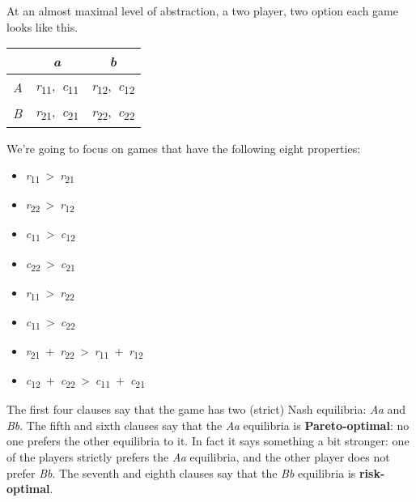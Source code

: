 \documentclass[
  11pt,
]{book}
\providecommand{\tightlist}{%
  \setlength{\itemsep}{0pt}\setlength{\parskip}{0pt}}
\begin{document}
At an almost maximal level of abstraction, a two player, two option each game looks like this.

\begin{longtable}[]{@{}lcc@{}}
\toprule()
& \emph{a} & \emph{b} \\
\midrule()
\endhead
\emph{A} & \emph{r}\textsubscript{11},~\emph{c}\textsubscript{11} & \emph{r}\textsubscript{12},~\emph{c}\textsubscript{12} \\
\emph{B} & \emph{r}\textsubscript{21},~\emph{c}\textsubscript{21} & \emph{r}\textsubscript{22},~\emph{c}\textsubscript{22} \\
\bottomrule()
\end{longtable}

We're going to focus on games that have the following eight properties:

\begin{itemize}
\tightlist
\item
  \emph{r}\textsubscript{11}~\textgreater~\emph{r}\textsubscript{21}
\item
  \emph{r}\textsubscript{22}~\textgreater~\emph{r}\textsubscript{12}
\item
  \emph{c}\textsubscript{11}~\textgreater~\emph{c}\textsubscript{12}
\item
  \emph{c}\textsubscript{22}~\textgreater~\emph{c}\textsubscript{21}
\item
  \emph{r}\textsubscript{11}~\textgreater~\emph{r}\textsubscript{22}
\item
  \emph{c}\textsubscript{11}~\textgreater~\emph{c}\textsubscript{22}
\item
  \emph{r}\textsubscript{21}~+~\emph{r}\textsubscript{22}~\textgreater~\emph{r}\textsubscript{11}~+~\emph{r}\textsubscript{12}
\item
  \emph{c}\textsubscript{12}~+~\emph{c}\textsubscript{22}~\textgreater~\emph{c}\textsubscript{11}~+~\emph{c}\textsubscript{21}
\end{itemize}

The first four clauses say that the game has two (strict) Nash equilibria: \emph{Aa} and \emph{Bb}. The fifth and sixth clauses say that the \emph{Aa} equilibria is \textbf{Pareto-optimal}: no one prefers the other equilibria to it. In fact it says something a bit stronger: one of the players strictly prefers the \emph{Aa} equilibria, and the other player does not prefer \emph{Bb}. The seventh and eighth clauses say that the \emph{Bb} equilibria is \textbf{risk-optimal}.
\end{document}
